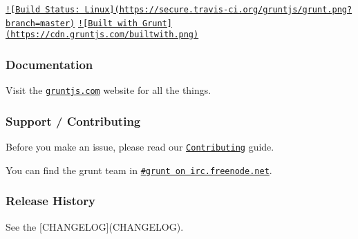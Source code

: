 \href{http://travis-ci.org/gruntjs/grunt}{\tt !\mbox{[}Build Status\+: Linux\mbox{]}(https\+://secure.\+travis-\/ci.\+org/gruntjs/grunt.\+png?branch=master)} \href{https://ci.appveyor.com/project/gruntjs/grunt}{\tt } \href{http://gruntjs.com/}{\tt !\mbox{[}Built with Grunt\mbox{]}(https\+://cdn.\+gruntjs.\+com/builtwith.\+png)}



\subsubsection*{Documentation}

Visit the \href{http://gruntjs.com/}{\tt gruntjs.\+com} website for all the things.

\subsubsection*{Support / Contributing}

Before you make an issue, please read our \href{http://gruntjs.com/contributing}{\tt Contributing} guide.

You can find the grunt team in \href{http://webchat.freenode.net/?channels=grunt}{\tt \#grunt on irc.\+freenode.\+net}.

\subsubsection*{Release History}

See the \mbox{[}C\+H\+A\+N\+G\+E\+L\+O\+G\mbox{]}(C\+H\+A\+N\+G\+E\+L\+O\+G). 